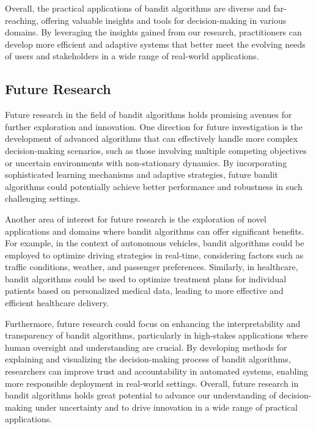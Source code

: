 \documentclass[a4paper, 12pt]{article}
\theoremstyle{definition}
\begin{document}
Overall, the practical applications of bandit algorithms are diverse and far-reaching, offering valuable insights and tools for decision-making in various domains. By leveraging the insights gained from our research, practitioners can develop more efficient and adaptive systems that better meet the evolving needs of users and stakeholders in a wide range of real-world applications.


\subsection{Future Research}
Future research in the field of bandit algorithms holds promising avenues for further exploration and innovation. One direction for future investigation is the development of advanced algorithms that can effectively handle more complex decision-making scenarios, such as those involving multiple competing objectives or uncertain environments with non-stationary dynamics. By incorporating sophisticated learning mechanisms and adaptive strategies, future bandit algorithms could potentially achieve better performance and robustness in such challenging settings.

Another area of interest for future research is the exploration of novel applications and domains where bandit algorithms can offer significant benefits. For example, in the context of autonomous vehicles, bandit algorithms could be employed to optimize driving strategies in real-time, considering factors such as traffic conditions, weather, and passenger preferences. Similarly, in healthcare, bandit algorithms could be used to optimize treatment plans for individual patients based on personalized medical data, leading to more effective and efficient healthcare delivery.

Furthermore, future research could focus on enhancing the interpretability and transparency of bandit algorithms, particularly in high-stakes applications where human oversight and understanding are crucial. By developing methods for explaining and visualizing the decision-making process of bandit algorithms, researchers can improve trust and accountability in automated systems, enabling more responsible deployment in real-world settings. Overall, future research in bandit algorithms holds great potential to advance our understanding of decision-making under uncertainty and to drive innovation in a wide range of practical applications.
\end{document}
